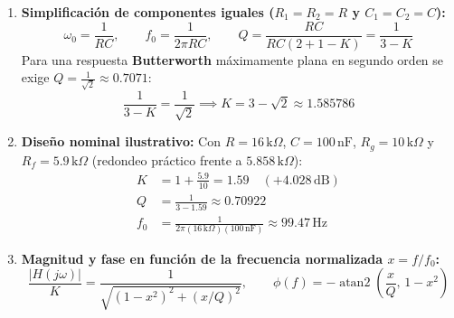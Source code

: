 \documentclass[11pt, a4paper]{article}
\begin{document}
\begin{enumerate}[noitemsep]
\begin{equation}
    \end{equation}
    \item \textbf{Simplificación de componentes iguales ($R_1 = R_2 = R$ y $C_1 = C_2 = C$):}
    \begin{equation}
        \omega_0 = \frac{1}{RC}, \qquad f_0 = \frac{1}{2\pi RC}, \qquad Q = \frac{RC}{RC(2 + 1 - K)} = \frac{1}{3 - K}
    \end{equation}
    Para una respuesta \textbf{Butterworth} máximamente plana en segundo orden se exige $Q = \frac{1}{\sqrt{2}} \approx 0.7071$:
    \begin{equation}
        \frac{1}{3 - K} = \frac{1}{\sqrt{2}} \implies K = 3 - \sqrt{2} \approx 1.585786
    \end{equation}
    \item \textbf{Diseño nominal ilustrativo:} Con $R = 16\,\text{k}\Omega$, $C = 100\,\text{nF}$, $R_g = 10\,\text{k}\Omega$ y $R_f = 5.9\,\text{k}\Omega$ (redondeo práctico frente a $5.858\,\text{k}\Omega$):
    \begin{align}
        K &= 1 + \frac{5.9}{10} = 1.59 \quad (+4.028\,\text{dB}) \\
        Q &= \frac{1}{3 - 1.59} \approx 0.70922 \\
        f_0 &= \frac{1}{2\pi(16\,\text{k}\Omega)(100\,\text{nF})} \approx 99.47\,\text{Hz}
    \end{align}
    \item \textbf{Magnitud y fase en función de la frecuencia normalizada $x = f/f_0$:}
    \begin{equation}
        \frac{|H(j\omega)|}{K} = \frac{1}{\sqrt{(1 - x^2)^2 + (x/Q)^2}}, \qquad \phi(f) = -\operatorname{atan2}\left(\frac{x}{Q},\, 1 - x^2\right)
    \end{equation}
\end{enumerate}
\end{document}
